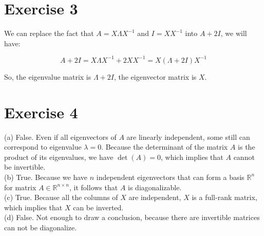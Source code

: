 \documentclass{article}
\begin{document}
\section{Exercise 3}

We can replace the fact that \( A = X \Lambda X^{-1} \) and \( I = X X^{-1} \) into \( A + 2I \), we will have:

\[
A + 2I = X \Lambda X^{-1} + 2 X X^{-1}
= X (\Lambda + 2I) X^{-1}
\]

So, the eigenvalue matrix is \( \Lambda + 2I \), the eigenvector matrix is \( X \).
\section{Exercise 4}
(a) False. Even if all eigenvectors of \(A\) are linearly independent, some still can correspond to eigenvalue \(\lambda = 0\). Because the determinant of the matrix \(A\) is the product of its eigenvalues, we have \(\det(A) = 0\), which implies that \(A\) cannot be invertible.
\\
(b) True. Because we have \(n\) independent eigenvectors that can form a basis \(\mathbb{R}^n\) for matrix \(A \in \mathbb{R}^{n \times n}\), it follows that \(A\) is diagonalizable.
\\
(c) True. Because all the columns of \(X\) are independent, \(X\) is a full-rank matrix, which implies that \(X\) can be inverted.
\\
(d) False. Not enough to draw a conclusion, because there are invertible matrices can not be diagonalize.
\end{document}
